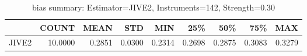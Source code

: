 \begin{table}[ht]
\centering
\caption{bias summary: Estimator=JIVE2, Instruments=142, Strength=0.30}
\begin{tabular}{lrrrrrrrr}
\toprule
 & COUNT & MEAN & STD & MIN & 25\% & 50\% & 75\% & MAX \\
\midrule
JIVE2 & 10.0000 & 0.2851 & 0.0300 & 0.2314 & 0.2698 & 0.2875 & 0.3083 & 0.3279 \\
\bottomrule
\end{tabular}
\end{table}
